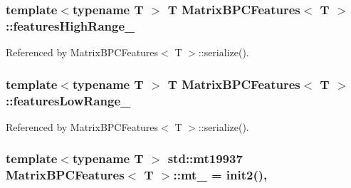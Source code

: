 \subsubsection[{\texorpdfstring{features\+High\+Range\+\_\+}{featuresHighRange_}}]{\setlength{\rightskip}{0pt plus 5cm}template$<$typename T $>$ T {\bf Matrix\+B\+P\+C\+Features}$<$ T $>$\+::features\+High\+Range\+\_\+\hspace{0.3cm}{\ttfamily [private]}}\hypertarget{classMatrixBPCFeatures_a35acee240ac781db0390c068c782437d}{}\label{classMatrixBPCFeatures_a35acee240ac781db0390c068c782437d}


Referenced by Matrix\+B\+P\+C\+Features$<$ T $>$\+::serialize().

\subsubsection[{\texorpdfstring{features\+Low\+Range\+\_\+}{featuresLowRange_}}]{\setlength{\rightskip}{0pt plus 5cm}template$<$typename T $>$ T {\bf Matrix\+B\+P\+C\+Features}$<$ T $>$\+::features\+Low\+Range\+\_\+\hspace{0.3cm}{\ttfamily [private]}}\hypertarget{classMatrixBPCFeatures_a973ec0283a77495339d330c482e73782}{}\label{classMatrixBPCFeatures_a973ec0283a77495339d330c482e73782}


Referenced by Matrix\+B\+P\+C\+Features$<$ T $>$\+::serialize().

\subsubsection[{\texorpdfstring{mt\+\_\+}{mt_}}]{\setlength{\rightskip}{0pt plus 5cm}template$<$typename T $>$ std\+::mt19937 {\bf Matrix\+B\+P\+C\+Features}$<$ T $>$\+::mt\+\_\+ = {\bf init2}()\hspace{0.3cm}{\ttfamily [static]}, {\ttfamily [private]}}\hypertarget{classMatrixBPCFeatures_aaf2ce60f69f7d3bbb85c4f4bc8b66383}{}\label{classMatrixBPCFeatures_aaf2ce60f69f7d3bbb85c4f4bc8b66383}
